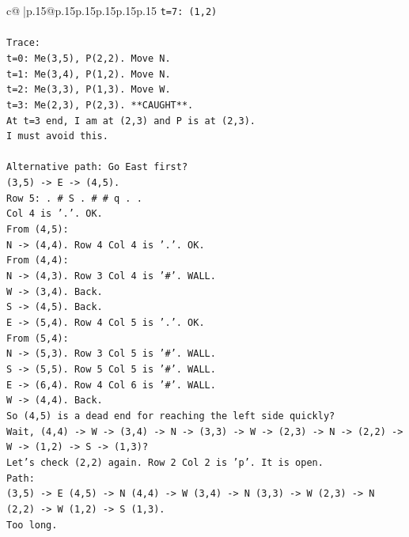 \documentclass{article}
\begin{document}
{\begin{supertabular}{c@{$\;$}|p{.15\linewidth}@{}p{.15\linewidth}p{.15\linewidth}p{.15\linewidth}p{.15\linewidth}p{.15\linewidth}}
{{{\texttt{t=7: (1,2)} \\
\\ 
\texttt{Trace:} \\
\texttt{t=0: Me(3,5), P(2,2). Move N.} \\
\texttt{t=1: Me(3,4), P(1,2). Move N.} \\
\texttt{t=2: Me(3,3), P(1,3). Move W.} \\
\texttt{t=3: Me(2,3), P(2,3). **CAUGHT**.} \\
\texttt{At t=3 end, I am at (2,3) and P is at (2,3).} \\
\texttt{I must avoid this.} \\
\\ 
\texttt{Alternative path: Go East first?} \\
\texttt{(3,5) {-}> E {-}> (4,5).} \\
\texttt{Row 5: . \# S . \# \# q . .} \\
\texttt{Col 4 is '.'. OK.} \\
\texttt{From (4,5):} \\
\texttt{N {-}> (4,4). Row 4 Col 4 is '.'. OK.} \\
\texttt{From (4,4):} \\
\texttt{N {-}> (4,3). Row 3 Col 4 is '\#'. WALL.} \\
\texttt{W {-}> (3,4). Back.} \\
\texttt{S {-}> (4,5). Back.} \\
\texttt{E {-}> (5,4). Row 4 Col 5 is '.'. OK.} \\
\texttt{From (5,4):} \\
\texttt{N {-}> (5,3). Row 3 Col 5 is '\#'. WALL.} \\
\texttt{S {-}> (5,5). Row 5 Col 5 is '\#'. WALL.} \\
\texttt{E {-}> (6,4). Row 4 Col 6 is '\#'. WALL.} \\
\texttt{W {-}> (4,4). Back.} \\
\texttt{So (4,5) is a dead end for reaching the left side quickly?} \\
\texttt{Wait, (4,4) {-}> W {-}> (3,4) {-}> N {-}> (3,3) {-}> W {-}> (2,3) {-}> N {-}> (2,2) {-}> W {-}> (1,2) {-}> S {-}> (1,3)?} \\
\texttt{Let's check (2,2) again. Row 2 Col 2 is 'p'. It is open.} \\
\texttt{Path:} \\
\texttt{(3,5) {-}> E (4,5) {-}> N (4,4) {-}> W (3,4) {-}> N (3,3) {-}> W (2,3) {-}> N (2,2) {-}> W (1,2) {-}> S (1,3).} \\
\texttt{Too long.} \\
}}}
\end{supertabular}}
\end{document}
